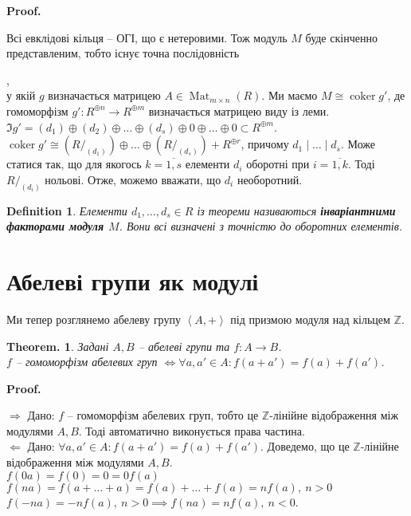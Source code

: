 \documentclass[a4paper, 10pt]{article}
\makeatletter
\def\rightproof{$\boxed{\Rightarrow}$ }
\def\leftproof{$\boxed{\Leftarrow}$ }
\theoremstyle{theoremdd}
\theoremstyle{theoremdd}
\newtheorem{definition}[theorem]{Definition}
\theoremstyle{theoremdd}
\theoremstyle{theoremdd}
\theoremstyle{theoremdd}
\theoremstyle{theoremdd}
\theoremstyle{theoremdd}
\theoremstyle{theoremdd}
\newtheorem*{theorem*}{Theorem.}
\theoremstyle{theoremdd}
\theoremstyle{theoremdd}
\theoremstyle{theoremdd}
\theoremstyle{theoremdd}
\theoremstyle{theoremdd}
\theoremstyle{theoremdd}
\theoremstyle{theoremdd}
\renewenvironment{proof}[1][Proof.\\]{\par
\pushQED{\hfill \qed}%
\normalfont \topsep6\p@\@plus6\p@\relax
\trivlist
\item\relax
{\bfseries
#1\@addpunct{.}}\hspace\labelsep\ignorespaces
}{%
\popQED\endtrivlist\@endpefalse
}
\DeclareMathOperator{\Mat}{Mat}
\DeclareMathOperator{\coker}{coker}
\makeatother
\begin{document}
\begin{proof}
Всі евклідові кільця -- ОГІ, що є нетеровими. Тож модуль $M$ буде скінченно представленим, тобто існує точна послідовність\\ ,\\
у якій $g$ визначається матрицею $A \in \Mat_{m \times n}(R)$. Ми маємо $M \cong \coker g'$, де гомоморфізм $g' \colon R^{\oplus n} \to R^{\oplus m}$ визначається матрицею виду із леми.\\
$\Im g' = (d_1) \oplus (d_2) \oplus \dots \oplus (d_s) \oplus 0 \oplus \dots \oplus 0 \subset R^{\oplus m}$.\\
$\coker g' \cong (R/_{(d_1)}) \oplus \dots \oplus (R/_{(d_s)}) + R^{\oplus r}$, причому $d_1 \mid \dots \mid d_s$. Може статися так, що для якогось $k = \overline{1,s}$ елементи $d_i$ оборотні при $i = \overline{1,k}$. Тоді $R/_{(d_i)}$ нольові. Отже, можемо вважати, що $d_i$ необоротний.
\end{proof}

\begin{definition}
Елементи $d_1,\dots,d_s \in R$ із теореми називаються \textbf{інваріантними факторами модуля $M$}. Вони всі визначені з точністю до оборотних елементів.
\end{definition}

\newpage
\section*{Абелеві групи як модулі}
Ми тепер розглянемо абелеву групу $\left< A, +\right>$ під призмою модуля над кільцем $\mathbb{Z}$.

\begin{theorem*}
Задані $A,B$ -- абелеві групи та $f \colon A \to B$.\\
$f$ -- гомоморфізм абелевих груп $\iff \forall a,a' \in A: f(a+a') = f(a) + f(a')$.
\end{theorem*}

\begin{proof}
\rightproof Дано: $f$ -- гомоморфізм абелевих груп, тобто це $\mathbb{Z}$-лінійне відображення між модулями $A,B$. Тоді автоматично виконується права частина.
\bigskip \\
\leftproof Дано: $\forall a,a' \in A: f(a+a') = f(a) + f(a')$. Доведемо, що це $\mathbb{Z}$-лінійне відображення між модулями $A,B$.\\
$f(0a) = f(0) = 0 = 0f(a)$\\
$f(na) = f(a+\dots + a) = f(a) + \dots + f(a) = n f(a),\ n > 0$\\
$f(-n a) = -n f(a),\ n > 0 \implies f(na) = nf(a),\ n < 0$.
\end{proof}
\end{document}
